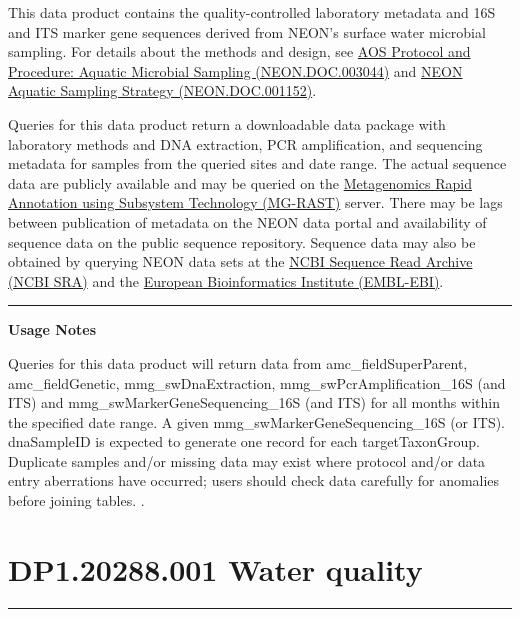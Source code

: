 \documentclass[]{article}
\begin{document}
This data product contains the quality-controlled laboratory metadata
and 16S and ITS marker gene sequences derived from NEON's surface water
microbial sampling. For details about the methods and design, see
\href{http://data.neonscience.org/api/v0/documents/NEON.DOC.003044vB}{AOS
Protocol and Procedure: Aquatic Microbial Sampling (NEON.DOC.003044)}
and
\href{http://data.neonscience.org/api/v0/documents/NEON.DOC.001152vA}{NEON
Aquatic Sampling Strategy (NEON.DOC.001152)}.

Queries for this data product return a downloadable data package with
laboratory methods and DNA extraction, PCR amplification, and sequencing
metadata for samples from the queried sites and date range. The actual
sequence data are publicly available and may be queried on the
\href{http://metagenomics.anl.gov/}{Metagenomics Rapid Annotation using
Subsystem Technology (MG-RAST)} server. There may be lags between
publication of metadata on the NEON data portal and availability of
sequence data on the public sequence repository. Sequence data may also
be obtained by querying NEON data sets at the
\href{https://www.ncbi.nlm.nih.gov/sra}{NCBI Sequence Read Archive (NCBI
SRA)} and the \href{https://www.ebi.ac.uk/}{European Bioinformatics
Institute (EMBL-EBI)}.

\begin{center}\rule{0.5\linewidth}{\linethickness}\end{center}

\textbf{Usage Notes}

Queries for this data product will return data from
amc\_fieldSuperParent, amc\_fieldGenetic, mmg\_swDnaExtraction,
mmg\_swPcrAmplification\_16S (and ITS) and
mmg\_swMarkerGeneSequencing\_16S (and ITS) for all months within the
specified date range. A given mmg\_swMarkerGeneSequencing\_16S (or ITS).
dnaSampleID is expected to generate one record for each
targetTaxonGroup. Duplicate samples and/or missing data may exist where
protocol and/or data entry aberrations have occurred; users should check
data carefully for anomalies before joining tables. \newpage
.

\section{DP1.20288.001 Water quality}\label{dp1.20288.001-water-quality}

\begin{center}\rule{0.5\linewidth}{\linethickness}\end{center}
\end{document}
